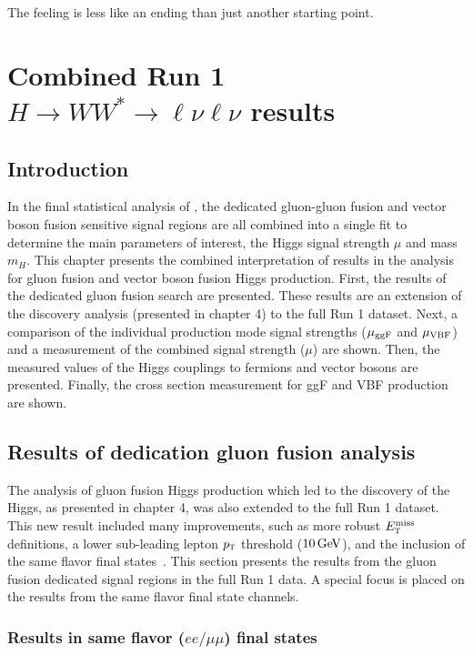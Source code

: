 \begin{savequote}[75mm]
The feeling is less like an ending than just another starting point.
\end{savequote}

\chapter{Combined Run 1 $H\rightarrow WW^{*}\rightarrow \ell\nu\ell\nu$ results}

\section{Introduction}

In the final statistical analysis of \HWWfull, the dedicated gluon-gluon fusion and vector boson fusion sensitive signal regions are all combined into a single fit to determine the main parameters of interest, the Higgs signal strength $\mu$ and mass $m_H$. This chapter presents the combined interpretation of results in the \HWWfull analysis for gluon fusion and vector boson fusion Higgs production. First, the results of the dedicated gluon fusion search are presented. These results are an extension of the discovery analysis (presented in chapter 4) to the full Run 1 dataset. Next, a comparison of the individual production mode signal strengths ($\mu_{{\rm ggF}}$ and $\mu_{{\rm VBF}}$) and a measurement of the combined signal strength ($\mu$) are shown. Then, the measured values of the Higgs couplings to fermions and vector bosons are presented. Finally, the cross section measurement for ggF and VBF production are shown. 

\section{Results of dedication gluon fusion \HWWfull analysis}

The analysis of gluon fusion Higgs production which led to the discovery of the Higgs, as presented in chapter 4, was also extended to the full Run 1 dataset. This new result included many improvements, such as more robust $E_{\textrm{\footnotesize\sc t}}^{\rm miss}$ definitions, a lower sub-leading lepton $p_{\textrm{\footnotesize\sc t}}$ threshold ($10 \GeV$), and the inclusion of the same flavor final states~\cite{WW2015}. This section presents the results from the gluon fusion dedicated signal regions in the full Run 1 data. A special focus is placed on the results from the same flavor final state channels. 

\subsection{Results in same flavor ($ee/\mu\mu$) final states}

